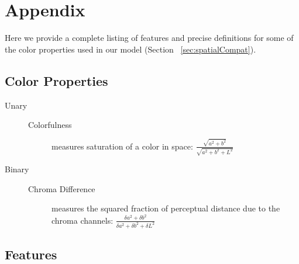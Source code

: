 \section*{Appendix}
\label{sec:appendix}

Here we provide a complete listing of features and precise definitions for some of the color properties used in our model (Section ~\ref{sec:spatialCompat}).

\subsection*{Color Properties}

\begin{description}

\item[Unary] \hfill
	\begin{description}
	  \item[Colorfulness] measures saturation of a color in \lab space: $\frac{\sqrt{a^2+b^2}}{\sqrt{a^2+b^2+L^2}}$
	\end{description}
	
\item[Binary] \hfill
	\begin{description}
	  \item[Chroma Difference] measures the squared fraction of perceptual distance due to the chroma channels: $\frac{\delta a^2+\delta b^2}{\delta a^2+\delta b^2+\delta L^2}$
	\end{description}
	
\end{description}

\subsection*{Features}

